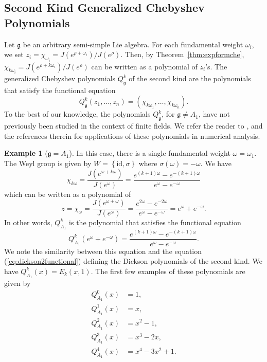\documentclass{amsart}
\newcommand{\mf}{\mathfrak}
\numberwithin{equation}{section}
\theoremstyle{plain}
\theoremstyle{definition}
\newtheorem{example}[theorem]{Example}
\begin{document}
\subsection{Second Kind Generalized Chebyshev Polynomials}
Let $\mf{g}$ be an arbitrary semi-simple Lie algebra. For each fundamental weight $\omega_i$, we set $z_i=\chi_{\omega_i}=J(e^{\rho+\omega_i})/J(e^\rho)$. Then, by Theorem~\ref{thm:expformche}, $\chi_{k\omega_i}=J(e^{\rho+k\omega_i})/J(e^\rho)$ can be written as a polynomial of $z_i$'s. The generalized Chebyshev polynomials $Q^k_{\mf{g}}$ of the second kind are the polynomials that satisfy the functional equation
$$Q^k_{\mf{g}}(z_1,\dots,z_n) = \left(\chi_{k\omega_1}, \dots, \chi_{k\omega_n}\right).$$
To the best of our knowledge, the polynomials $Q^k_{\mathfrak g}$, for $\mathfrak g \neq A_1$, have not previously been studied in the context of finite fields. We refer the reader to \cite{hubertsinger2022}, and the references therein for applications of these polynomials in numerical analysis.

\begin{example}[$\mf{g}=A_1$]
In this case, there is a single fundamental weight $\omega=\omega_1$. The Weyl group is given by $W=\left\{\text{id},\sigma\right\}$ where $\sigma(\omega)=-\omega$. We have
$$ \chi_{k\omega} = \frac{J(e^{\omega+k\omega})}{J(e^\omega)} =\frac{e^{(k+1)\omega}-e^{-(k+1)\omega}}{e^\omega-e^{-\omega}}$$
which can be written as a polynomial of
$$
z=\chi_{\omega}=\frac{J(e^{\omega+\omega})}{J(e^\omega)}=\frac{e^{2\omega}-e^{-2\omega}}{e^\omega-e^{-\omega}}=e^\omega+e^{-\omega}.
$$
In other words, $Q^k_{A_1}$ is the polynomial that satisfies the functional equation
\begin{equation}\label{eq:QA1functionalformal}
	Q^k_{A_1}(e^\omega+e^{-\omega})=\frac{e^{(k+1)\omega}-e^{-(k+1)\omega}}{e^\omega-e^{-\omega}}.
\end{equation}
We note the similarity between this equation and the equation  (\ref{eq:dickson2functional}) defining the Dickson polynomials of the second kind. We have $Q_{A_1}^k(x) = E_k(x,1)$. The first few examples of these polynomials are given by
\begin{align*}
	Q^0_{A_1}(x)&=1,\\
	Q^1_{A_1}(x)&=x,\\
	Q^2_{A_1}(x)&=x^2-1,\\
	Q^3_{A_1}(x)&=x^3-2x,\\
	Q^4_{A_1}(x)&=x^4-3x^2+1.
\end{align*}
\end{example}
\end{document}
